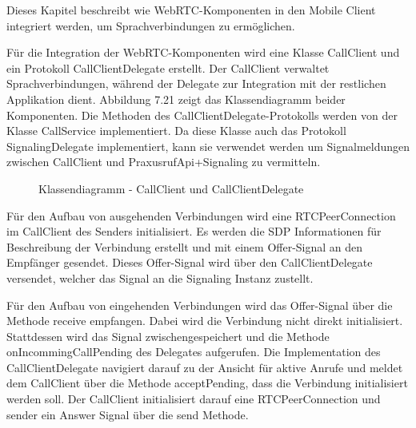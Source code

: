 Dieses Kapitel beschreibt wie WebRTC-Komponenten in den Mobile Client integriert werden, um Sprachverbindungen zu ermöglichen.

Für die Integration der WebRTC-Komponenten wird eine Klasse CallClient und ein Protokoll CallClientDelegate erstellt.
Der CallClient verwaltet Sprachverbindungen, während der Delegate zur Integration mit der restlichen Applikation dient.
Abbildung 7.21 zeigt das Klassendiagramm beider Komponenten.
Die Methoden des CallClientDelegate-Protokolls werden von der Klasse CallService implementiert.
Da diese Klasse auch das Protokoll SignalingDelegate implementiert, kann sie verwendet werden um Signalmeldungen zwischen CallClient und PraxusrufApi+Signaling zu vermitteln.

\begin{figure}[h]
    \centering
    \begin{minipage}[b]{0.6\textwidth}
        \caption{Klassendiagramm - CallClient und CallClientDelegate}
    \end{minipage}
\end{figure}

Für den Aufbau von ausgehenden Verbindungen wird eine RTCPeerConnection im CallClient des Senders initialisiert.
Es werden die SDP Informationen für Beschreibung der Verbindung erstellt und mit einem Offer-Signal an den Empfänger gesendet.
Dieses Offer-Signal wird über den CallClientDelegate versendet, welcher das Signal an die Signaling Instanz zustellt.

Für den Aufbau von eingehenden Verbindungen wird das Offer-Signal über die Methode receive empfangen.
Dabei wird die Verbindung nicht direkt initialisiert.
Stattdessen wird das Signal zwischengespeichert und die Methode onIncommingCallPending des Delegates aufgerufen.
Die Implementation des CallClientDelegate navigiert darauf zu der Ansicht für aktive Anrufe und meldet dem CallClient über die Methode acceptPending, dass die Verbindung initialisiert werden soll.
Der CallClient initialisiert darauf eine RTCPeerConnection und sender ein Answer Signal über die send Methode.

